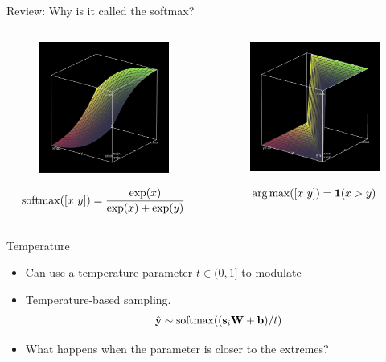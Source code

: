 \documentclass{beamer}
\begin{document}
\begin{frame}{Review: Why is it called the softmax?}

  \begin{columns}[t]
    \begin{column}[t]{0.5\textwidth}


      \begin{figure}
        \centering
        \includegraphics[width=5cm]{softmax}
      \end{figure}
      \[\softmax([x\ y]) = \frac{\exp(x)}{\displaystyle  \exp(x) + \exp(y)}  \]
    \end{column}

    \begin{column}[t]{0.5\textwidth}


      \begin{figure}
        \centering
      \includegraphics[width=5cm]{argmax}
      \end{figure}
      \[\argmax([x\ y]) = \indicator(x > y) \]
    \end{column}
  \end{columns}
\end{frame}


\begin{frame}{Temperature}
  \begin{itemize}
  \item Can use a temperature parameter $t \in (0, 1]$ to modulate

    \air
  \item Temperature-based sampling.
      \[\hat{\boldy} \sim \softmax((\bolds_i \boldW + \boldb)/t)\]

      \air
      
    \item What happens when the parameter is closer to the extremes?
  \end{itemize}
\end{frame}
\end{document}
